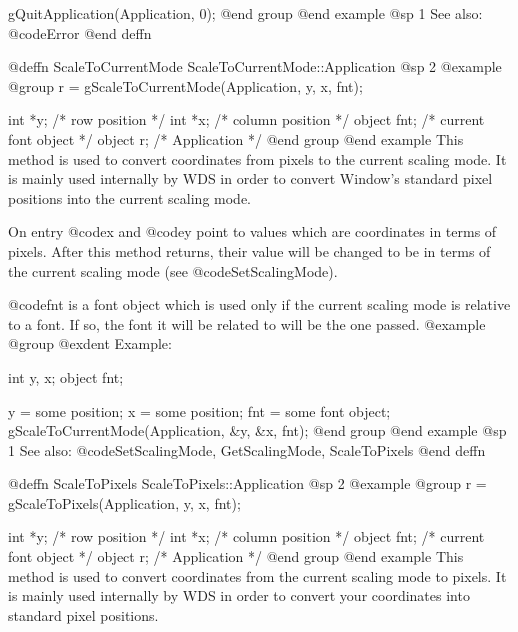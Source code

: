 gQuitApplication(Application, 0);
@end group
@end example
@sp 1
See also:  @code{Error}
@end deffn











@deffn {ScaleToCurrentMode} ScaleToCurrentMode::Application
@sp 2
@example
@group
r = gScaleToCurrentMode(Application, y, x, fnt);

int     *y;     /*  row position         */
int     *x;     /*  column position      */
object  fnt;    /*  current font object  */
object  r;      /*  Application          */
@end group
@end example
This method is used to convert coordinates from pixels to the current
scaling mode.  It is mainly used internally by WDS in order to
convert Window's standard pixel positions into the current scaling mode.

On entry @code{x} and @code{y} point to values which are coordinates in
terms of pixels.  After this method returns, their value will be changed
to be in terms of the current scaling mode (see @code{SetScalingMode}).

@code{fnt} is a font object which is used only if the current scaling
mode is relative to a font.  If so, the font it will be related to
will be the one passed.
@example
@group
@exdent Example:

int     y, x;
object  fnt;

y = some position;
x = some position;
fnt = some font object;
gScaleToCurrentMode(Application, &y, &x, fnt);
@end group
@end example
@sp 1
See also:  @code{SetScalingMode, GetScalingMode, ScaleToPixels}
@end deffn















@deffn {ScaleToPixels} ScaleToPixels::Application
@sp 2
@example
@group
r = gScaleToPixels(Application, y, x, fnt);

int     *y;     /*  row position         */
int     *x;     /*  column position      */
object  fnt;    /*  current font object  */
object  r;      /*  Application          */
@end group
@end example
This method is used to convert coordinates from the current scaling mode
to pixels.  It is mainly used internally by WDS in order to convert
your coordinates into standard pixel positions.

